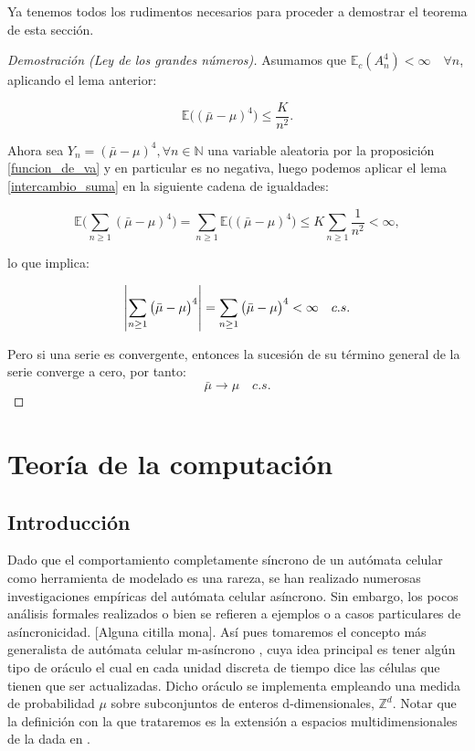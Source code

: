 \documentclass[../proyecto.tex]{memoir}
\begin{document}
Ya tenemos todos los rudimentos necesarios para proceder a demostrar el teorema de esta sección.

\begin{proof}[Demostración (Ley de los grandes números)]

Asumamos que $\mathds{E}_c( A_n^4) < \infty \quad \forall n$, aplicando el lema anterior:

$$
	\mathds{E} \big( ( \bar{ \mu } - \mu ) ^ 4 \big) \leq \frac{K}{n^{2}}.
$$

Ahora sea $Y_n = ( \bar{ \mu } - \mu ) ^ 4, \forall n \in \mathds{N}$ una variable aleatoria por la proposición \ref{funcion_de_va} y en particular es no negativa, luego podemos aplicar el lema \ref{intercambio_suma} en la siguiente cadena de igualdades:

$$
	\mathds{E} \big( \sum_{n \geq 1}( \bar{ \mu } - \mu ) ^ 4 \big) = \sum_{n \geq 1} \mathds{E} \big( ( \bar{ \mu } - \mu ) ^ 4 \big)  \leq K\sum_{n \geq 1}\frac{1}{n^{2}} < \infty,
$$

lo que implica:

$$
\abs{ \sum_{n \geq 1} \big( \bar{ \mu } - \mu \big)^ 4 } = \sum_{n \geq 1} \big( \bar{ \mu } - \mu \big)^ 4 < \infty \quad c.s. 
$$

Pero si una serie es convergente, entonces la sucesión de su término general de la serie converge a cero, por tanto:
$$
 \bar{ \mu } \to \mu \quad c.s.
$$
\end{proof}

\section{Teoría de la computación}

\subsection{Introducción}
Dado que el comportamiento completamente síncrono de un autómata celular como herramienta de modelado es una rareza, se han realizado numerosas investigaciones empíricas del autómata celular asíncrono. Sin embargo, los pocos análisis formales realizados o bien se refieren a ejemplos o a casos particulares de asíncronicidad. [Alguna citilla mona]. Así pues tomaremos el concepto más generalista de autómata celular m-asíncrono \cite{oraculo}, cuya idea principal es tener algún tipo de oráculo el cual en cada unidad discreta de tiempo dice las células que tienen que ser actualizadas. Dicho oráculo se implementa empleando una medida de probabilidad $\mu$ sobre subconjuntos de enteros d-dimensionales, $\mathds{Z}^{d}$. Notar que la definición con la que trataremos es la extensión a espacios multidimensionales de la dada en \cite{oraculo}.
\end{document}
